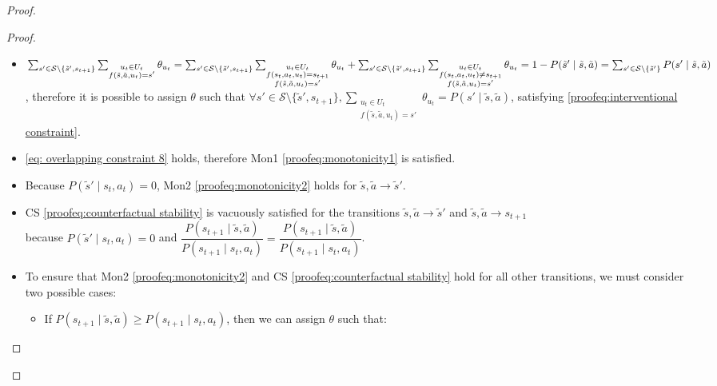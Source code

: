 \begin{proof}
\begin{proof}
\begin{itemize}
    \item $\sum_{s' \in \mathcal{S}\setminus\{\tilde{s}', s_{t+1}\}}\sum_{\substack{u_t \in U_t \\f(\tilde{s}, \tilde{a}, u_t) = s'}} \theta_{u_t} = \sum_{s' \in \mathcal{S}\setminus\{\tilde{s}', s_{t+1}\}}\sum_{\substack{u_t \in U_t \\f(s_t, a_t, u_t) = s_{t+1} \\ f(\tilde{s}, \tilde{a}, u_t) = s'}} \theta_{u_t} + \sum_{s' \in \mathcal{S}\setminus\{\tilde{s}', s_{t+1}\}}\sum_{\substack{u_t \in U_t \\f(s_t, a_t, u_t) \neq s_{t+1} \\ f(\tilde{s}, \tilde{a}, u_t) = s'}} \theta_{u_t} \\= 1 - P(\tilde{s}' \mid \tilde{s}, \tilde{a}) = \sum_{s' \in \mathcal{S}\setminus\{\tilde{s}'\}}P(s' \mid \tilde{s}, \tilde{a})$, therefore it is possible to assign $\theta$ such that $\forall s' \in \mathcal{S}\setminus\{\tilde{s}', s_{t+1}\}, \sum_{\substack{u_t \in U_t \\ f(\tilde{s}, \tilde{a}, u_t) = s'}}{\theta_{u_t}} = P(s' \mid \tilde{s}, \tilde{a})$, satisfying \eqref{proofeq:interventional constraint}.
    
    \item \eqref{eq: overlapping constraint 8} holds, therefore Mon1 \eqref{proofeq:monotonicity1} is satisfied.
    
    \item Because $P(\tilde{s}' \mid s_t, a_t) = 0$, Mon2 \eqref{proofeq:monotonicity2} holds for $\tilde{s}, \tilde{a} \rightarrow \tilde{s}'$.

    \item CS \eqref{proofeq:counterfactual stability} is vacuously satisfied for the transitions $\tilde{s}, \tilde{a} \rightarrow \tilde{s}'$ and $\tilde{s}, \tilde{a} \rightarrow s_{t+1}$ \\because $P(\tilde{s}' \mid s_t, a_t) =0$ and $\dfrac{P(s_{t+1} \mid \tilde{s}, \tilde{a})}{P(s_{t+1} \mid s_t, a_t)} = \dfrac{P(s_{t+1} \mid \tilde{s}, \tilde{a})}{P(s_{t+1} \mid s_t, a_t)}$.

    \item To ensure that Mon2 \eqref{proofeq:monotonicity2} and CS \eqref{proofeq:counterfactual stability} hold for all other transitions, we must consider two possible cases:

    \begin{itemize}
        \item If $P(s_{t+1} \mid \tilde{s}, \tilde{a}) \geq P(s_{t+1} \mid s_t, a_t)$, then we can assign $\theta$ such that:
        

\end{itemize}
\end{itemize}
\end{proof}
\end{proof}
